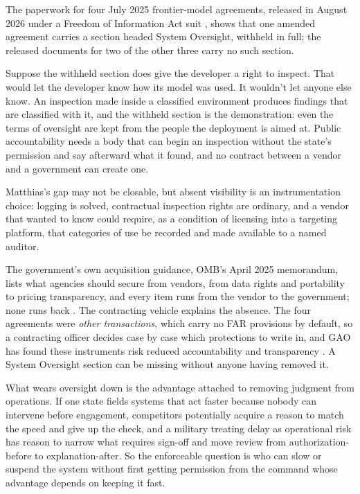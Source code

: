 The paperwork for four July 2025 frontier-model agreements, released in August 2026 under a Freedom of Information Act suit \autocite{lasst2026dodai,biddle2026contracts}, shows that one amended agreement carries a section headed System Oversight, withheld in full; the released documents for two of the other three carry no such section.

Suppose the withheld section does give the developer a right to inspect. That would let the developer know how its model was used. It wouldn't let anyone else know. An inspection made inside a classified environment produces findings that are classified with it, and the withheld section is the demonstration: even the terms of oversight are kept from the people the deployment is aimed at. Public accountability needs a body that can begin an inspection without the state's permission and say afterward what it found, and no contract between a vendor and a government can create one.

Matthias's gap may not be closable, but absent visibility is an instrumentation choice: logging is solved, contractual inspection rights are ordinary, and a vendor that wanted to know could require, as a condition of licensing into a targeting platform, that categories of use be recorded and made available to a named auditor.

The government's own acquisition guidance, OMB's April 2025 memorandum, lists what agencies should secure from vendors, from data rights and portability to pricing transparency, and every item runs from the vendor to the government; none runs back \autocite{omb2025aiacquisition}. The contracting vehicle explains the absence. The four agreements were \emph{other transactions}, which carry no FAR provisions by default, so a contracting officer decides case by case which protections to write in, and GAO has found these instruments risk reduced accountability and transparency \autocite{gao2026aiacquisitions}. A System Oversight section can be missing without anyone having removed it.

What wears oversight down is the advantage attached to removing judgment from operations. If one state fields systems that act faster because nobody can intervene before engagement, competitors potentially acquire a reason to match the speed and give up the check, and a military treating delay as operational risk has reason to narrow what requires sign-off and move review from authorization-before to explanation-after.
So the enforceable question is who can slow or suspend the system without first getting permission from the command whose advantage depends on keeping it fast.
